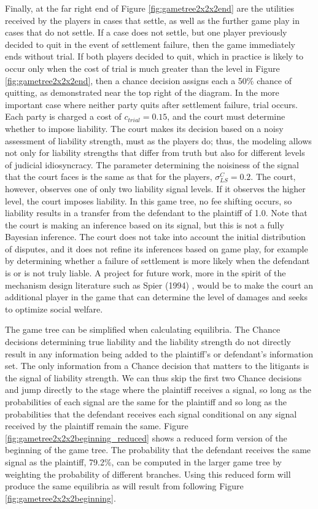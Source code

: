 \documentclass{article}
\begin{document}
Finally, at the far right end of Figure \ref{fig:gametree2x2x2end} are the utilities received by the players in cases that settle, as well as the further game play in cases that do not settle. If a case does not settle, but one player previously decided to quit in the event of settlement failure, then the game immediately ends without trial. If both players decided to quit, which in practice is likely to occur only when the cost of trial is much greater than the level in Figure \ref{fig:gametree2x2x2end}, then a chance decision assigns each a 50\% chance of quitting, as demonstrated near the top right of the diagram. In the more important case where neither party quits after settlement failure, trial occurs. Each party is charged a cost of $c_{trial}=0.15$, and  the court must determine whether to impose liability. The court makes its decision based on a noisy assessment of liability strength, must as the players do; thus, the modeling allows not only for liability strengths that differ from truth but also for different levels of judicial idiosyncracy. The parameter determining the noisiness of the signal that the court faces is the same as that for the players, $\sigma_{LS}^C=0.2$. The court, however, observes one of only two liability signal levels. If it observes the higher level, the court imposes liability. In this game tree, no fee shifting occurs, so liability results in a transfer from the defendant to the plaintiff of 1.0.  Note that the court is making an inference based on its signal, but this is not a fully Bayesian inference. The court does not take into account the initial distribution of disputes, and it does not refine its inferences based on game play, for example by determining whether a failure of settlement is more likely when the defendant is or is not truly liable. A project for future work, more in the spirit of the mechanism design literature such as Spier (1994) \cite{spier}, would be to make the court an additional player in the game that can determine the level of damages and seeks to optimize social welfare.

The game tree can be simplified when calculating equilibria. The Chance decisions determining true liability and the liability strength do not directly result in any information being added to the plaintiff's or defendant's information set. The only information from a Chance decision that matters to the litigants is the signal of liability strength. We can thus skip the first two Chance decisions and jump directly to the stage where the plaintiff receives a signal, so long as the probabilities of each signal are the same for the plaintiff and so long as the probabilities that the defendant receives each signal conditional on any signal received by the plaintiff remain the same. Figure \ref{fig:gametree2x2x2beginning_reduced} shows a reduced form version of the beginning of the game tree. The probability that the defendant receives the same signal as the plaintiff, 79.2\%, can be computed in the larger game tree by weighting the probability of different branches. Using this reduced form will produce the same equilibria as will result from following Figure \ref{fig:gametree2x2x2beginning}. 
\end{document}
